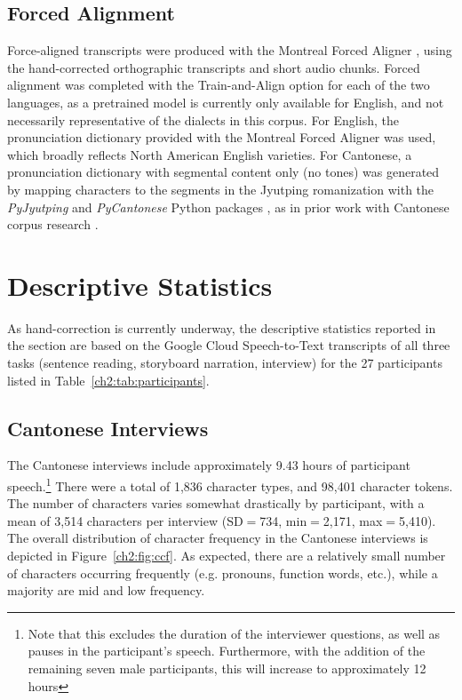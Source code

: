 \subsection{Forced Alignment}\label{ch2:subsec:alignment}
Force-aligned transcripts were produced with the Montreal Forced Aligner \citep{mcauliffe_2017_mfa}, using the hand-corrected orthographic transcripts and short audio chunks. Forced alignment was completed with the Train-and-Align option for each of the two languages, as a pretrained model is currently only available for English, and not necessarily representative of the dialects in this corpus. For English, the pronunciation dictionary provided with the Montreal Forced Aligner was used, which broadly reflects North American English varieties. For Cantonese, a pronunciation dictionary with segmental content only (no tones) was generated by mapping characters to the segments in the Jyutping romanization with the \textit{PyJyutping} \citep{yau_2019_pyjyutping} and \textit{PyCantonese} Python packages \citep{lee_2018_pycantonese}, as in prior work with Cantonese corpus research \citep{tse_2019_heritage}.

\section{Descriptive Statistics}\label{ch2:sec:statistics}
As hand-correction is currently underway, the descriptive statistics reported in the section are based on the Google Cloud Speech-to-Text transcripts of all three tasks (sentence reading, storyboard narration, interview) for the 27 participants listed in Table~\ref{ch2:tab:participants}. 

\subsection{Cantonese Interviews}\label{ch2:subsec:cantonese_descriptive}
The Cantonese interviews include approximately 9.43 hours of participant speech.\footnote{Note that this excludes the duration of the interviewer questions, as well as pauses in the participant's speech. Furthermore, with the addition of the remaining seven male participants, this will increase to approximately 12 hours} There were a total of 1,836 character types, and 98,401 character tokens. The number of characters varies somewhat drastically by participant, with a mean of 3,514 characters per interview (SD$=$734, min$=$2,171, max$=$5,410). The overall distribution of character frequency in the Cantonese interviews is depicted in Figure~\ref{ch2:fig:ccf}. As expected, there are a relatively small number of characters occurring frequently (e.g. pronouns, function words, etc.), while a majority are mid and low frequency. 

